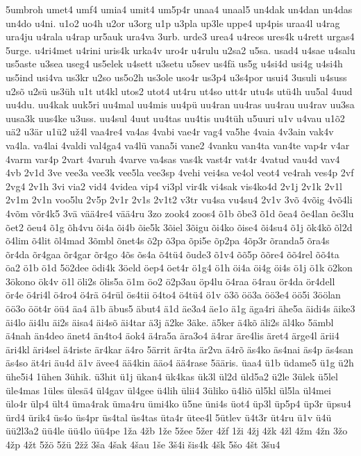 {5umbroh
umet4
umf4
umia4
umit4
um5p4r
unaa4
unaal5
un4dak
un4dan
un4das
un4do
u4ni.
u1o2
uo4h
u2or
u3org
u1p
u3pla
up3le
uppe4
up4pis
uraa4l
u4rag
ura4ju
u4rala
u4rap
ur5auk
ura4va
3urb.
urde3
urea4
u4reos
ures4k
u4rett
urgas4
5urge.
u4ri4met
u4rini
uris4k
urka4v
uro4r
u4rulu
u2sa2
u5sa.
usad4
u4sae
u4salu
us5aste
u3sea
useg4
us5elek
u4sett
u3setu
u5sev
us4fä
us5g
u4si4d
usi4g
u4si4h
us5ind
usi4va
us3kr
u2so
us5o2h
us3ole
uso4r
us3p4
u3s4por
usui4
3usuli
u4suss
u2sõ
u2sü
us3üh
u1t
ut4kl
utos2
utot4
ut4ru
ut4so
utt4r
utu4s
utü4h
uu5al
4uud
uu4du.
uu4kak
uuk5ri
uu4mal
uu4mis
uu4pü
uu4ran
uu4ras
uu4rau
uu4rav
uu3sa
uusa3k
uus4ke
u3uss.
uu4sul
4uut
uu4tas
uu4tis
uu4tüh
u5uuri
u1v
u4vau
u1õ2
uä2
u3är
u1ü2
už4l
vaa4re4
va4as
4vabi
vae4r
vag4
va5he
4vaia
4v3ain
vak4v
va4la.
va4lai
4valdi
val4ga4
va4lü
vana5i
vane2
4vanku
van4ta
van4te
vap4r
v4ar
4varm
var4p
2vart
4varuh
4varve
va4sas
vas4k
vast4r
vat4r
4vatud
vau4d
vav4
4vb
2v1d
3ve
vee3a
vee3k
vee5la
vee3sp
4vehi
vei4sa
ve4ol
veot4
ve4rah
ves4p
2vf
2vg4
2v1h
3vi
via2
vid4
4videa
vip4
vi3pl
vir4k
vi4sak
vis4ko4d
2v1j
2v1k
2v1l
2v1m
2v1n
voo5lu
2v5p
2v1r
2v1s
2v1t2
v3tr
vu4sa
vu4su4
2v1v
3võ
4võig
4võ4li
4võm
võr4k5
3vä
vää4re4
vää4ru
3zo
zook4
zoos4
õ1b
õbe3
õ1d
õea4
õe4lan
õe3lu
õet2
õeu4
õ1g
õh4vu
õi4a
õi4b
õie5k
3õiel
3õigu
õi4ko
õise4
õi4su4
õ1j
õk4kõ
õl2d
õ4lim
õ4lit
õl4mad
3õmbl
õnet4s
õ2p
õ3pa
õpi5e
õp2pa
4õp3r
õranda5
õra4s
õr4da
õr4gaa
õr4gar
õr4go
4õs
õs4a
õ4tü4
õude3
õ1v4
õõ5p
õõre4
õõ4rel
õõ4ta
öa2
ö1b
ö1d
5ö2dee
ödi4k
3öeld
öep4
öet4r
ö1g4
ö1h
öi4a
öi4g
öi4s
ö1j
ö1k
ö2kon
3ökono
ök4v
ö1l
öli2s
ölis5a
ö1m
öo2
ö2p3au
öp4lu
ö4raa
ö4rau
ör4da
ör4dell
ör4e
ö4ri4l
ö4ro4
ö4rä
ö4rül
ös4tii
ö4to4
ö4tü4
ö1v
ö3õ
öö3a
öö3e4
öö5i
3öölan
öö3o
ööt4r
öü4
äa4
ä1b
äbus5
äbut4
ä1d
äe3a4
äe1o
ä1g
äga4ri
ähe5a
äidi4s
äike3
äi4lo
äi4lu
äi2s
äisa4
äi4sõ
äi4tar
ä3j
ä2ke
3äke.
ä5ker
ä4kõ
äli2s
äl4ko
5ämbl
ä4nah
än4deo
änet4
än4to4
äok4
ä4ra5a
ära3o4
ä4rar
äre4lis
äret4
ärge4l
ärii4
äri4kl
äri4sel
ä4riste
är4kar
ä4ro
5ärrit
är4ta
är2va
ä4rõ
äs4ko
äs4nai
äs4p
äs4san
äs4so
ät4ri
äu4d
ä1v
ävee4
ää4kin
ääo4
ää4rase
5ääris.
üaa4
ü1b
üdame5
ü1g
ü2h
ühe5i4
1ühen
3ühik.
ü3hit
ü1j
ükan4
ük4kas
ük3l
ül2d
üld5a2
ü2le
3ülek
ü5lel
üle4mas
1üles
ülesä4
ül4gav
ül4gee
ü4lih
ülii4
3üliko
ü4liõ
ül5kl
ül5la
ül4mei
ülo4r
ülp4
ült4
üma4rak
üma4ru
ümi4ko
ü5ne
üni4s
üot4
üp3l
üp5p4
üp3r
üpsu4
ürd4
ürik4
üs4o
üs4pr
üs4tal
üs4tas
üta4r
ütee4l
5ütlev
ü4t3r
üt4ru
ü1v
ü4ü
üü2l3a2
üü4le
üü4lo
üü4pe
1ža
4žb
1že
5žee
5žer
4žf
1ži
4žj
4žk
4žl
4žm
4žn
3žo
4žp
4žt
5žö
5žü
2žž
3ša
4šak
4šau
1še
3š4i
šis4k
4šk
5šo
4št
3šu4
}
